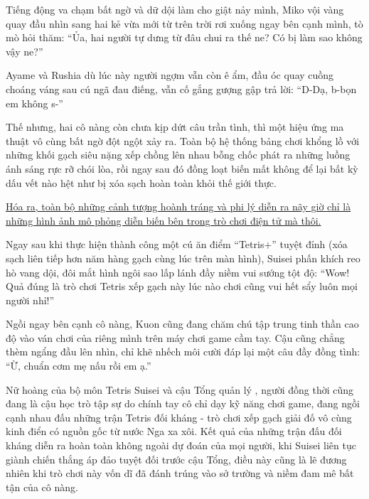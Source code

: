 \documentclass[../main.tex]{subfiles}
\begin{document}
Tiếng động va chạm bất ngờ và dữ dội làm cho giật nảy mình, Miko vội vàng quay đầu nhìn sang hai kẻ vừa mới từ trên trời rơi xuống ngay bên cạnh mình, tò mò hỏi thăm: ``Ủa, hai người tự dưng từ đâu chui ra thế ne? Có bị làm sao không vậy ne?''

Ayame và Rushia dù lúc này người ngợm vẫn còn ê ẩm, đầu óc quay cuồng choáng váng sau cú ngã đau điếng, vẫn cố gắng gượng gập trả lời: ``D-Dạ, b-bọn em không s-''

Thế nhưng, hai cô nàng còn chưa kịp dứt câu trần tình, thì một hiệu ứng ma thuật vô cùng bất ngờ đột ngột xảy ra. Toàn bộ hệ thống bảng chơi khổng lồ với những khối gạch siêu nặng xếp chồng lên nhau bỗng chốc phát ra những luồng ánh sáng rực rỡ chói lòa, rồi ngay sau đó đồng loạt biến mất không để lại bất kỳ dấu vết nào hệt như bị xóa sạch hoàn toàn khỏi thế giới thực.


\begin{center}
  \uline{Hóa ra, toàn bộ những cảnh tượng hoành tráng và phi lý diễn ra nãy giờ chỉ là những hình ảnh mô phỏng diễn biến bên trong trò chơi điện tử mà thôi.}
\end{center}

Ngay sau khi thực hiện thành công một cú ăn điểm ``Tetris+'' tuyệt đỉnh (xóa sạch liên tiếp hơn năm hàng gạch cùng lúc trên màn hình), Suisei phấn khích reo hò vang dội, đôi mắt hình ngôi sao lấp lánh đầy niềm vui sướng tột độ: ``Wow! Quả đúng là trò chơi Tetris xếp gạch này lúc nào chơi cũng vui hết sẩy luôn mọi người nhỉ!''

Ngồi ngay bên cạnh cô nàng, Kuon cũng đang chăm chú tập trung tinh thần cao độ vào ván chơi của riêng mình trên máy chơi game cầm tay. Cậu cũng chẳng thèm ngẩng đầu lên nhìn, chỉ khẽ nhếch môi cười đáp lại một câu đầy đồng tình: ``Ừ, chuẩn cơm mẹ nấu rồi em ạ.''

\omk

Nữ hoàng của bộ môn Tetris Suisei và cậu Tổng quản lý \hll, người đồng thời cũng đang là cậu học trò tập sự do chính tay cô chỉ dạy kỹ năng chơi game, đang ngồi cạnh nhau đấu những trận Tetris đối kháng - trò chơi xếp gạch giải đố vô cùng kinh điển có nguồn gốc từ nước Nga xa xôi. Kết quả của những trận đấu đối kháng diễn ra hoàn toàn không ngoài dự đoán của mọi người, khi Suisei liên tục giành chiến thắng áp đảo tuyệt đối trước cậu Tổng, điều này cũng là lẽ đương nhiên khi trò chơi này vốn dĩ đã đánh trúng vào sở trường và niềm đam mê bất tận của cô nàng.
\end{document}
